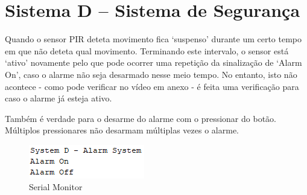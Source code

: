 \section{Sistema D – Sistema de Segurança}

Quando o sensor PIR deteta movimento fica `suspenso' durante um certo tempo em que não deteta qual movimento. Terminando este intervalo, o sensor está `ativo' novamente pelo que pode ocorrer uma repetição da sinalização de `Alarm On', caso o alarme não seja desarmado nesse meio tempo. No entanto, isto não acontece - como pode verificar no vídeo em anexo - é feita uma verificação para caso o alarme já esteja ativo.

Também é verdade para o desarme do alarme com o pressionar do botão. Múltiplos pressionares não desarmam múltiplas vezes o alarme.

\begin{figure}[H]
    \centering
    \includegraphics{images/testes/sisD_serialmonitor.png}
    \caption{Serial Monitor}
\end{figure}

